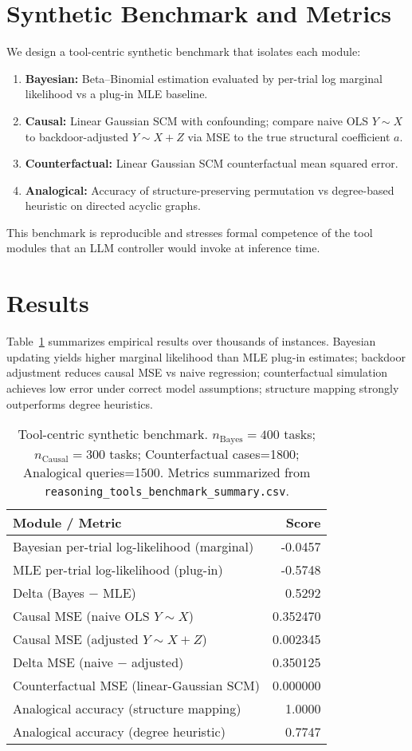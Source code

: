 \documentclass[11pt]{article}
\begin{document}
\section{Synthetic Benchmark and Metrics}
We design a tool-centric synthetic benchmark that isolates each module:
\begin{enumerate}
\item \textbf{Bayesian:} Beta--Binomial estimation evaluated by per-trial log marginal likelihood vs a plug-in MLE baseline.
\item \textbf{Causal:} Linear Gaussian SCM with confounding; compare naive OLS $Y\!\sim\!X$ to backdoor-adjusted $Y\!\sim\!X{+}Z$ via MSE to the true structural coefficient $a$.
\item \textbf{Counterfactual:} Linear Gaussian SCM counterfactual mean squared error.
\item \textbf{Analogical:} Accuracy of structure-preserving permutation vs degree-based heuristic on directed acyclic graphs.
\end{enumerate}
This benchmark is reproducible and stresses formal competence of the tool modules that an LLM controller would invoke at inference time.

\section{Results}
Table~\ref{tab:results} summarizes empirical results over thousands of instances. Bayesian updating yields higher marginal likelihood than MLE plug-in estimates; backdoor adjustment reduces causal MSE vs naive regression; counterfactual simulation achieves low error under correct model assumptions; structure mapping strongly outperforms degree heuristics.


\begin{table}[t]
\centering
\begin{tabular}{l r}
\toprule
\textbf{Module / Metric} & \textbf{Score} \\ \midrule
Bayesian per-trial log-likelihood (marginal) & -0.0457 \\
MLE per-trial log-likelihood (plug-in) & -0.5748 \\
Delta (Bayes $-$ MLE) & 0.5292 \\
Causal MSE (naive OLS $Y\!\sim\!X$) & 0.352470 \\
Causal MSE (adjusted $Y\!\sim\!X{+}Z$) & 0.002345 \\
Delta MSE (naive $-$ adjusted) & 0.350125 \\
Counterfactual MSE (linear-Gaussian SCM) & 0.000000 \\
Analogical accuracy (structure mapping) & 1.0000 \\
Analogical accuracy (degree heuristic) & 0.7747 \\
\bottomrule
\end{tabular}
\caption{Tool-centric synthetic benchmark. $n_\text{Bayes}=400$ tasks; $n_\text{Causal}=300$ tasks; Counterfactual cases=1800; Analogical queries=1500. Metrics summarized from \texttt{reasoning\_tools\_benchmark\_summary.csv}.}
\label{tab:results}
\end{table}
\end{document}
